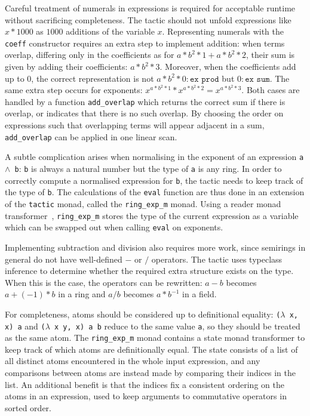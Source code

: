 \documentclass{llncs}
\newcommand{\lean}[1]{\texttt{#1}\xspace} %
\newcommand{\pow}{$\wedge$\xspace}
\newcommand{\ringexp}{\lean{ring\_exp}}
\begin{document}
Careful treatment of numerals in expressions is required for acceptable runtime without sacrificing completeness.
The tactic should not unfold expressions like $x * 1000$ as $1000$ additions of the variable $x$.
Representing numerals with the \lean{coeff} constructor requires an extra step to implement addition:
when terms overlap, differing only in the coefficients as for $a * b^2 * 1 + a * b^2 * 2$,
their sum is given by adding their coefficients: $a * b^2 * 3$.
Moreover, when the coefficients add up to $0$, the correct representation is not $a * b^2 * 0 : \lean{ex prod}$ but $0 : \lean{ex sum}$.
The same extra step occurs for exponents: $x ^ {a * b^2 * 1} * x ^ {a * b^2 * 2} %
= x ^ {a * b^2 * 3}$.
Both cases are handled by a function \lean{add\_overlap} which returns the correct sum if there is overlap,
or indicates that there is no such overlap.
By choosing the order on expressions such that overlapping terms will appear adjacent in a sum,
\lean{add\_overlap} can be applied in one linear scan.

A subtle complication arises when normalising in the exponent of an expression \lean{a \pow b}:
\lean{b} is always a natural number but the type of \lean{a} is any ring.
In order to correctly compute a normalised expression for \lean{b},
the tactic needs to keep track of the type of \lean{b}.
The calculations of the \lean{eval} function are thus done in an extension of the \lean{tactic} monad,
called the \lean{ring\_exp\_m} monad.
Using a reader monad transformer~\cite{monad-transformers},
\lean{ring\_exp\_m} stores the type of the current expression
as a variable which can be swapped out when calling \lean{eval} on exponents.

Implementing subtraction and division also requires more work,
since semirings in general do not have well-defined $-$ or $/$ operators.
The tactic uses typeclass inference to determine whether the required extra structure exists on the type.
When this is the case, the operators can be rewritten:
$a - b$ becomes $a + (-1) * b$ in a ring
and $a / b$ becomes $a * b^{-1}$ in a field.

For completeness, atoms should be considered up to definitional equality:
\lean{($\lambda$ x, x) a} and \lean{($\lambda$ x y, x) a b} reduce to the same value \lean{a},
so %
they should be treated as the same atom.
The \lean{ring\_exp\_m} monad contains a state monad transformer to keep track of which atoms are definitionally equal.
The state consists of a list of all distinct atoms encountered in the whole input expression,
and any comparisons between atoms are instead made by comparing their indices in the list.
An additional benefit is that the indices fix a consistent ordering on the atoms in an expression,
used to keep arguments to commutative operators in sorted order.
\end{document}
